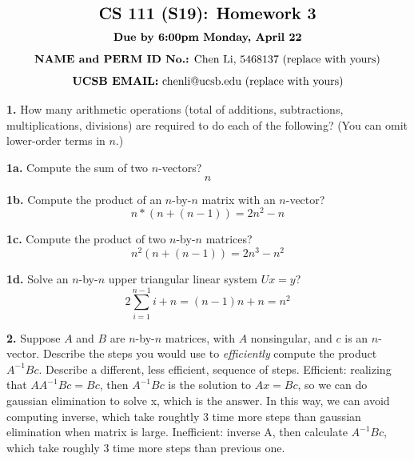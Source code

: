 \documentclass[11pt]{article}
\begin{document}
$$\mbox{\Large \textbf {CS 111 (S19): Homework 3}}$$
$$\mbox{\textbf {Due by 6:00pm Monday, April 22}}$$
$$\mbox{\textbf {NAME and PERM ID No.:} Chen Li, 5468137 (replace with yours)}$$
$$\mbox{\textbf {UCSB EMAIL:} chenli@ucsb.edu (replace with yours)}$$

\par\bigskip
{\bf 1.}
How many arithmetic operations 
(total of additions, subtractions, multiplications, divisions)
are required to do each of the following?
(You can omit lower-order terms in $n$.)

\par\medskip
{\bf 1a.} Compute the sum of two $n$-vectors?
$$n$$
\par\medskip
{\bf 1b.} Compute the product of an $n$-by-$n$ matrix with an $n$-vector?
$$n*(n+(n-1))=2n^2-n$$
\par\medskip
{\bf 1c.} Compute the product of two $n$-by-$n$ matrices?
$$n^2(n+(n-1))=2n^3-n^2$$
\par\medskip
{\bf 1d.} Solve an $n$-by-$n$ upper triangular linear system $Ux=y$?
$$2\sum_{i=1}^{n-1}i+n=(n-1)n+n=n^2
$$
\newpage

\par\bigskip
{\bf 2.}
Suppose $A$ and $B$ are $n$-by-$n$ matrices, with $A$ nonsingular,
and $c$ is an $n$-vector.
Describe the steps you would use to {\em efficiently} compute the
product $A^{-1}Bc$.
Describe a different, less efficient, sequence of steps.
\newline\newline Efficient: realizing that $AA^{-1}Bc = Bc$, then $A^{-1}Bc$ is the solution to $Ax = Bc$, so we can do gaussian elimination to solve x, which is the answer. In this way, we can avoid computing inverse, which take roughtly 3 time more steps than gaussian elimination when matrix is large.\newline\newline
Inefficient: inverse A, then calculate $A^{-1}Bc$, which take roughly 3 time more steps than previous one.
\newpage
\end{document}
